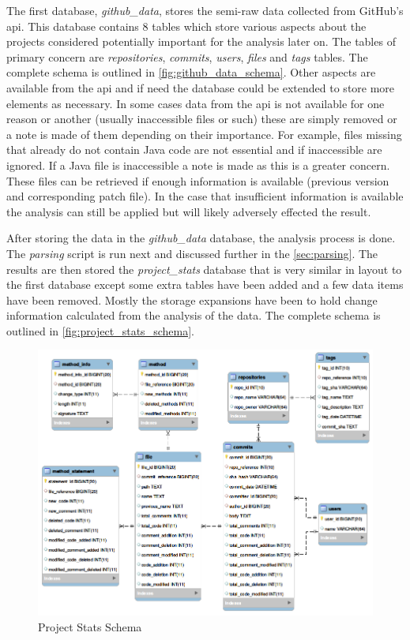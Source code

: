 The first database, \textit{github\_data}, stores the semi-raw data collected from GitHub's \gls{api}. This database contains 8 tables which store various aspects about the projects considered potentially important for the analysis later on. The tables of primary concern are \textit{repositories}, \textit{commits}, \textit{users}, \textit{files} and \textit{tags} tables. The complete schema is outlined in \autoref{fig:github_data_schema}. Other aspects are available from the \gls{api} and if need the database could be extended to store more elements as necessary. In some cases data from the \gls{api} is not available for one reason or another (usually inaccessible files or such) these are simply removed or a note is made of them depending on their importance. For example, files missing that already do not contain Java code are not essential and if inaccessible are ignored. If a Java file is inaccessible a note is made as this is a greater concern. These files can be retrieved if enough information is available (previous version and corresponding patch file). In the case that insufficient information is available the analysis can still be applied but will likely adversely effected the result.

After storing the data in the \textit{github\_data} database, the analysis process is done. The \textit{parsing} script is run next and discussed further in the \autoref{sec:parsing}. The results are then stored the \textit{project\_stats} database that is very similar in layout to the first database except some extra tables have been added and a few data items have been removed. Mostly the storage expansions have been to hold change information calculated from the analysis of the data. The complete schema is outlined in \autoref{fig:project_stats_schema}.

\begin{figure}[!ht]
    \centering
        \includegraphics[width=1.0\textwidth]{images/project_stats_schema}
    \caption{Project Stats Schema}
    \label{fig:project_stats_schema}
\end{figure}

